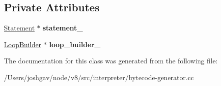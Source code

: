 \subsection*{Private Attributes}
\begin{DoxyCompactItemize}
\item 
\hyperlink{classv8_1_1internal_1_1_statement}{Statement} $\ast$ {\bfseries statement\+\_\+}\hypertarget{classv8_1_1internal_1_1interpreter_1_1_bytecode_generator_1_1_control_scope_for_iteration_a30a661f360ce4ace65cd02348b537b13}{}\label{classv8_1_1internal_1_1interpreter_1_1_bytecode_generator_1_1_control_scope_for_iteration_a30a661f360ce4ace65cd02348b537b13}

\item 
\hyperlink{classv8_1_1internal_1_1interpreter_1_1_loop_builder}{Loop\+Builder} $\ast$ {\bfseries loop\+\_\+builder\+\_\+}\hypertarget{classv8_1_1internal_1_1interpreter_1_1_bytecode_generator_1_1_control_scope_for_iteration_a2bb90fda58ca4490827df2424e8c7f5c}{}\label{classv8_1_1internal_1_1interpreter_1_1_bytecode_generator_1_1_control_scope_for_iteration_a2bb90fda58ca4490827df2424e8c7f5c}

\end{DoxyCompactItemize}


The documentation for this class was generated from the following file\+:\begin{DoxyCompactItemize}
\item 
/\+Users/joshgav/node/v8/src/interpreter/bytecode-\/generator.\+cc\end{DoxyCompactItemize}
